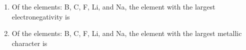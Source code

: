 \documentclass[main.tex]{subfiles}
\begin{document}
\begin{multicols*}{2}
\begin{enumerate}
\begin{enumerate}[label=(\alph*)]
\end{enumerate}
\item Of the elements:  B, C, F, Li, and Na, the element with the largest electronegativity is
\begin{enumerate}[label=(\alph*)]
\end{enumerate}

\item Of the elements:  B, C, F, Li, and Na, the element with the largest metallic character is
\begin{enumerate}[label=(\alph*)]
\end{enumerate}


\restoregeometry
\end{enumerate}
\end{multicols*}
\pagecolor{green!10}\afterpage{\nopagecolor}\newpage
\end{document}
